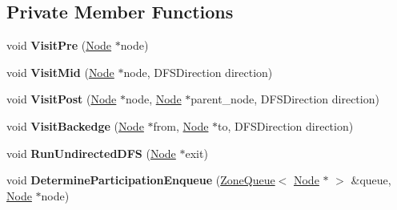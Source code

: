 \subsection*{Private Member Functions}
\begin{DoxyCompactItemize}
\item 
void {\bfseries Visit\+Pre} (\hyperlink{classv8_1_1internal_1_1compiler_1_1_node}{Node} $\ast$node)\hypertarget{classv8_1_1internal_1_1compiler_1_1_control_equivalence_a7d643fe14720cb75c209183d2562c8dd}{}\label{classv8_1_1internal_1_1compiler_1_1_control_equivalence_a7d643fe14720cb75c209183d2562c8dd}

\item 
void {\bfseries Visit\+Mid} (\hyperlink{classv8_1_1internal_1_1compiler_1_1_node}{Node} $\ast$node, D\+F\+S\+Direction direction)\hypertarget{classv8_1_1internal_1_1compiler_1_1_control_equivalence_a7cc34f7c85e145091e9530ce35028976}{}\label{classv8_1_1internal_1_1compiler_1_1_control_equivalence_a7cc34f7c85e145091e9530ce35028976}

\item 
void {\bfseries Visit\+Post} (\hyperlink{classv8_1_1internal_1_1compiler_1_1_node}{Node} $\ast$node, \hyperlink{classv8_1_1internal_1_1compiler_1_1_node}{Node} $\ast$parent\+\_\+node, D\+F\+S\+Direction direction)\hypertarget{classv8_1_1internal_1_1compiler_1_1_control_equivalence_a538b315ef218c37db851d1cb5196a220}{}\label{classv8_1_1internal_1_1compiler_1_1_control_equivalence_a538b315ef218c37db851d1cb5196a220}

\item 
void {\bfseries Visit\+Backedge} (\hyperlink{classv8_1_1internal_1_1compiler_1_1_node}{Node} $\ast$from, \hyperlink{classv8_1_1internal_1_1compiler_1_1_node}{Node} $\ast$to, D\+F\+S\+Direction direction)\hypertarget{classv8_1_1internal_1_1compiler_1_1_control_equivalence_a8c0c8b6ec8e2ecae026240c0b359a84a}{}\label{classv8_1_1internal_1_1compiler_1_1_control_equivalence_a8c0c8b6ec8e2ecae026240c0b359a84a}

\item 
void {\bfseries Run\+Undirected\+D\+FS} (\hyperlink{classv8_1_1internal_1_1compiler_1_1_node}{Node} $\ast$exit)\hypertarget{classv8_1_1internal_1_1compiler_1_1_control_equivalence_a2ce70e43c797365a4f92b06758c9f763}{}\label{classv8_1_1internal_1_1compiler_1_1_control_equivalence_a2ce70e43c797365a4f92b06758c9f763}

\item 
void {\bfseries Determine\+Participation\+Enqueue} (\hyperlink{classv8_1_1internal_1_1_zone_queue}{Zone\+Queue}$<$ \hyperlink{classv8_1_1internal_1_1compiler_1_1_node}{Node} $\ast$ $>$ \&queue, \hyperlink{classv8_1_1internal_1_1compiler_1_1_node}{Node} $\ast$node)\hypertarget{classv8_1_1internal_1_1compiler_1_1_control_equivalence_a0510f95346c8f7116c7d8b8355c8371a}{}\label{classv8_1_1internal_1_1compiler_1_1_control_equivalence_a0510f95346c8f7116c7d8b8355c8371a}


\end{DoxyCompactItemize}
